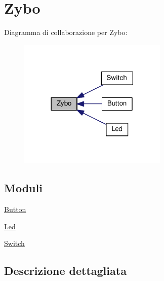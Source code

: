 \hypertarget{group___zybo}{\section{Zybo}
\label{group___zybo}
}
Diagramma di collaborazione per Zybo\+:\nopagebreak
\begin{figure}[H]
\begin{center}
\leavevmode
\includegraphics[width=201pt]{group___zybo}
\end{center}
\end{figure}
\subsection*{Moduli}
\begin{DoxyCompactItemize}
\item 
\hyperlink{group___button}{Button}
\item 
\hyperlink{group___led}{Led}
\item 
\hyperlink{group___switch}{Switch}
\end{DoxyCompactItemize}


\subsection{Descrizione dettagliata}
